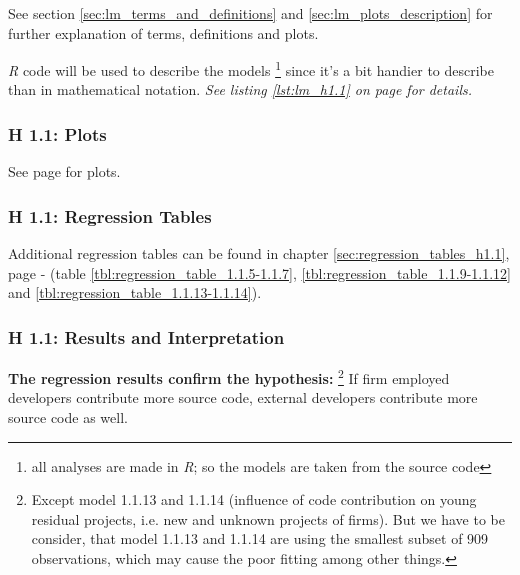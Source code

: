 See section \ref{sec:lm_terms_and_definitions} and \ref{sec:lm_plots_description} for further explanation of terms, definitions and plots.

\textit{R} code will be used to describe the models \footnote{all analyses are made in \textit{R}; so the models are taken from the source code} since it's a bit handier to describe than in mathematical notation. \textit{See listing \ref{lst:lm_h1.1} on page \pageref{lst:lm_h1.1} for details.}

\subsubsection{H 1.1: Plots}

See page \pageref{sec:h_1.1_plots} for plots.

\subsubsection{H 1.1: Regression Tables}

Additional regression tables can be found in chapter \ref{sec:regression_tables_h1.1}, page \pageref{tbl:regression_table_1.1.5-1.1.7} - \pageref{tbl:regression_table_1.1.13-1.1.14} (table \ref{tbl:regression_table_1.1.5-1.1.7}, \ref{tbl:regression_table_1.1.9-1.1.12} and \ref{tbl:regression_table_1.1.13-1.1.14}).

\begin{table}[!h] \centering
  \scriptsize{
	  
  }
	\caption{Influence of internal commits on external commits (and v.v.) on "All Projects" (Model 1.1.1 - 1.1.2) and "Top Projects" (Model 1.1.3 - 1.1.4)}
	\label{tbl:hyp1_model_1-4}
\end{table}

\clearpage
\subsubsection{H 1.1: Results and Interpretation}

\textbf{The regression results confirm the hypothesis:} \footnote{Except model 1.1.13 and 1.1.14 (influence of code contribution on young residual projects, i.e. new and unknown projects of firms). But we have to be consider, that model 1.1.13 and 1.1.14 are using the smallest subset of 909 observations, which may cause the poor fitting among other things.} If firm employed developers contribute more source code, external developers contribute more source code as well.

